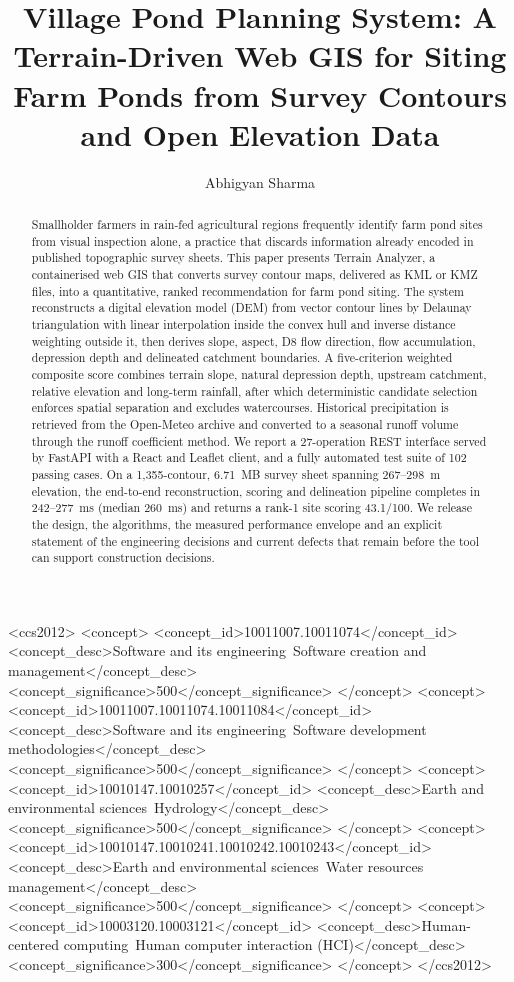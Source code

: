 \documentclass[sigconf,review,10pt]{acmart}
\author{Abhigyan Sharma}
\begin{document}
\title{Village Pond Planning System: A Terrain-Driven Web GIS for
Siting Farm Ponds from Survey Contours and Open Elevation Data}

\begin{abstract}
Smallholder farmers in rain-fed agricultural regions frequently identify
farm pond sites from visual inspection alone, a practice that discards
information already encoded in published topographic survey sheets. This
paper presents Terrain Analyzer, a containerised web GIS that converts
survey contour maps, delivered as KML or KMZ files, into a quantitative,
ranked recommendation for farm pond siting. The system reconstructs a
digital elevation model (DEM) from vector contour lines by Delaunay
triangulation with linear interpolation inside the convex hull and inverse
distance weighting outside it, then derives slope, aspect, D8 flow
direction, flow accumulation, depression depth and delineated catchment
boundaries. A five-criterion weighted composite score combines terrain
slope, natural depression depth, upstream catchment, relative elevation
and long-term rainfall, after which deterministic candidate selection
enforces spatial separation and excludes watercourses. Historical
precipitation is retrieved from the Open-Meteo archive and converted to a
seasonal runoff volume through the runoff coefficient method. We report a
27-operation REST interface served by FastAPI with a React and Leaflet
client, and a fully automated test suite of 102 passing cases. On a
1,355-contour, 6.71~MB survey sheet spanning 267--298~m elevation, the
end-to-end reconstruction, scoring and delineation pipeline completes in
242--277~ms (median 260~ms) and returns a rank-1 site scoring 43.1/100.
We release the design, the algorithms, the measured performance envelope
and an explicit statement of the engineering decisions and current
defects that remain before the tool can support construction decisions.
\end{abstract}

\begin{CCSXML}
<ccs2012>
  <concept>
    <concept_id>10011007.10011074</concept_id>
    <concept_desc>Software and its engineering~Software creation and management</concept_desc>
    <concept_significance>500</concept_significance>
  </concept>
  <concept>
    <concept_id>10011007.10011074.10011084</concept_id>
    <concept_desc>Software and its engineering~Software development methodologies</concept_desc>
    <concept_significance>500</concept_significance>
  </concept>
  <concept>
    <concept_id>10010147.10010257</concept_id>
    <concept_desc>Earth and environmental sciences~Hydrology</concept_desc>
    <concept_significance>500</concept_significance>
  </concept>
  <concept>
    <concept_id>10010147.10010241.10010242.10010243</concept_id>
    <concept_desc>Earth and environmental sciences~Water resources management</concept_desc>
    <concept_significance>500</concept_significance>
  </concept>
  <concept>
    <concept_id>10003120.10003121</concept_id>
    <concept_desc>Human-centered computing~Human computer interaction (HCI)</concept_desc>
    <concept_significance>300</concept_significance>
  </concept>
</ccs2012>
\end{CCSXML}
\end{document}
